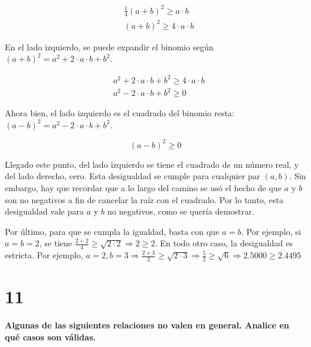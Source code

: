 \documentclass{article}
\begin{document}
\begin{subequations}
\begin{align}
& \frac{1}{4} (a + b)^2 \geq a \cdot b \\
& (a + b)^2 \geq 4 \cdot a \cdot b
\end{align}
\end{subequations}

En el lado izquierdo, se puede expandir el binomio según $(a + b)^2 = a^2 + 2 \cdot a \cdot b + b^2$.

\begin{subequations}
\begin{align}
& a^2 + 2 \cdot a \cdot b + b^2 \geq 4 \cdot a \cdot b \\
& a^2 - 2 \cdot a \cdot b + b^2 \geq 0
\end{align}
\end{subequations}

Ahora bien, el lado izquierdo es el cuadrado del binomio resta: $(a - b)^2 = a^2 - 2 \cdot a \cdot b + b^2$.

\begin{equation}
(a - b)^2 \geq 0
\end{equation}

Llegado este punto, del lado izquierdo se tiene el cuadrado de un número real, y del lado derecho, cero. Esta desigualdad se cumple para cualquier par $(a, b)$. Sin embargo, hay que recordar que a lo largo del camino se usó el hecho de que $a$ y $b$ son no negativos a fin de cancelar la raíz con el cuadrado. Por lo tanto, esta desigualdad vale para $a$ y $b$ no negativos, como se quería demostrar.

Por último, para que se cumpla la igualdad, basta con que $a = b$. Por ejemplo, si $a = b = 2$, se tiene $\frac{2 + 2}{4} \geq \sqrt{2 \cdot 2} \Rightarrow 2 \geq 2 $. En todo otro caso, la desigualdad es estricta. Por ejemplo, $a = 2, b = 3 \Rightarrow \frac{2+3}{2} \geq \sqrt{2 \cdot 3} \Rightarrow \frac{5}{2} \geq \sqrt{6} \Rightarrow 2.5000 \geq 2.4495$

\section*{11}
\label{sec:11}

\textbf{Algunas de las siguientes relaciones no valen en general. Analice en qué casos son válidas.}
\end{document}
